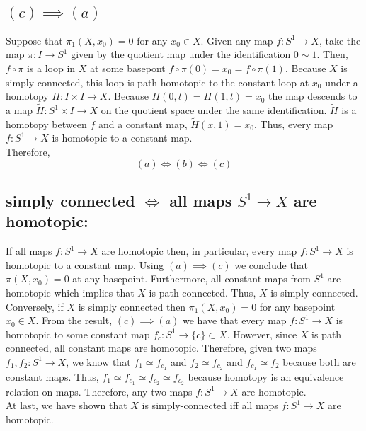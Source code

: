 \documentclass[12pt]{extarticle}
\begin{document}
\subsection*{$(c) \implies (a)$}
Suppose that $\pi_1(X, x_0) = 0$ for any $x_0 \in X$. Given any map $f : S^1 \to X$, take the map $\pi : I \to S^1$ given by the quotient map under the identification $0 \sim 1$. Then, $f \circ \pi$ is a loop in $X$ at some basepont $f \circ \pi(0) = x_0 = f \circ \pi(1)$. Because $X$ is simply connected, this loop is path-homotopic to the constant loop at $x_0$ under a homotopy $H : I \times I \to X$. Because $H(0, t) = H(1, t) = x_0$ the map descends to a map $\tilde{H} : S^1 \times I \to X$ on the quotient space under the same identification. $\tilde{H}$ is a homotopy between $f$ and a constant map, $\tilde{H}(x, 1) = x_0$. Thus, every map $f : S^1 \to X$ is homotopic to a constant map.  
\bigskip \\
Therefore, \[(a) \iff (b) \iff (c)\] 
\subsection*{simply connected $\iff$ all maps $S^1 \to X$ are homotopic:}
If all maps $f : S^1 \to X$ are homotopic then, in particular, every map $f : S^1 \to X$ is homotopic to a constant map. Using $(a) \implies (c)$ we conclude that $\pi(X, x_0) = 0$ at any basepoint. Furthermore, all constant maps from $S^1$ are homotopic which implies that $X$ is path-connected. Thus, $X$ is simply connected. 
\bigskip \\
Conversely, if $X$ is simply connected then $\pi_1(X, x_0) = 0$ for any basepoint $x_0 \in X$. From the result, $(c) \implies (a)$ we have that every map $f : S^1 \to X$ is homotopic to some constant map $f_c : S^1 \to \{c\} \subset X$. However, since $X$ is path connected, all constant maps are homotopic. Therefore, given two maps $f_1, f_2 : S^1 \to X$, we know that $f_1 \simeq f_{c_1}$ and $f_2 \simeq f_{c_2}$ and $f_{c_1} \simeq f_{2}$ because both are constant maps. Thus, $f_1 \simeq f_{c_1} \simeq f_{c_2} \simeq f_{c_2}$ because homotopy is an equivalence relation on maps. Therefore, any two maps $f : S^1 \to X$ are homotopic. \bigskip \\    

At last, we have shown that $X$ is simply-connected iff all maps $f : S^1 \to X$ are homotopic. 
\end{document}
